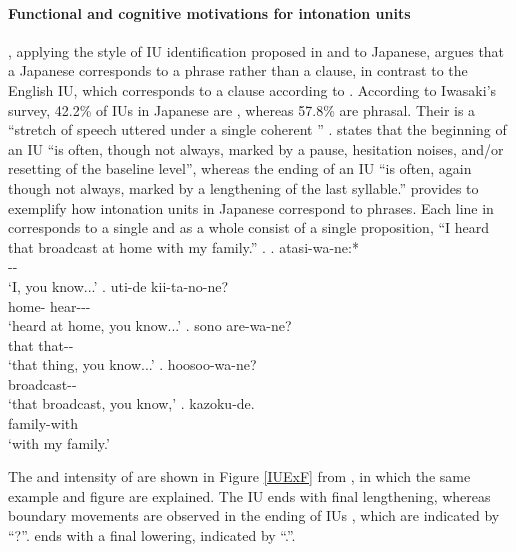 \paragraph{Functional and cognitive motivations for intonation units}
\largerpage
{},
applying the style of IU identification proposed in  and   to Japanese,
argues that a Japanese  corresponds to a phrase rather than a clause,
in contrast to the English IU, which corresponds to a clause according to .
According to Iwasaki's survey,
42.2\% of IUs in Japanese are , whereas 57.8\% are phrasal.
Their  is a ``stretch of speech uttered under a single coherent '' \cite[17]{duboisetal92}.
 states that
the beginning of an IU ``is often, though not always, marked by a pause, hesitation noises, and/or resetting of the baseline  level'',
whereas the ending of an IU ``is often, again though not always, marked by a lengthening of the last syllable.''
 provides \Next to exemplify how intonation units in Japanese correspond to phrases.
Each line in \Next corresponds to a single 
and \Next[a-e] as a whole consist of a single proposition,
``I heard that broadcast at home with my family.''
%
\ex.
 \ag. atasi-wa-ne:* \\
      -- \\
      `I, you know...'
 \bg. uti-de kii-ta-no-ne? \\
      home- hear--- \\
      `heard at home, you know...'
 \bg. sono are-wa-ne? \\
      that that-- \\
      `that thing, you know...'
 \bg. hoosoo-wa-ne? \\
      broadcast-- \\
      `that broadcast, you know,'
 \bg. kazoku-de. \\
      family-with \\
      `with my family.'
 \hfill{\cite[40]{iwasaki93}}

The  and intensity of \Next are shown in Figure \ref{IUExF} from
, in which the same example and figure are explained.
The IU \Next[a] ends with final  lengthening,
whereas boundary  movements are observed in the ending of IUs \Next[b-d],
which are indicated by ``?''.
\Next[e] ends with a final lowering, indicated by ``.''.


